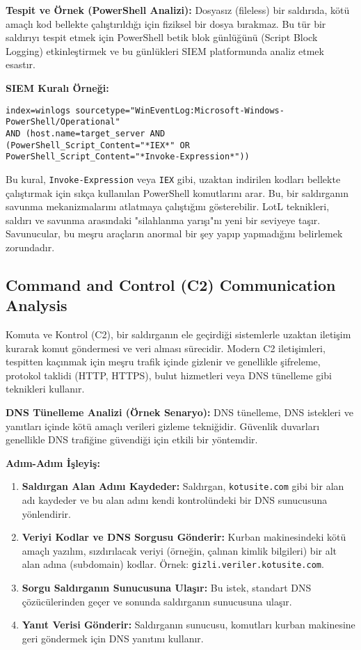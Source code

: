 \textbf{Tespit ve Örnek (PowerShell Analizi):}
Dosyasız (fileless) bir saldırıda, kötü amaçlı kod bellekte çalıştırıldığı için fiziksel bir dosya bırakmaz. Bu tür bir saldırıyı tespit etmek için PowerShell betik blok günlüğünü (Script Block Logging) etkinleştirmek ve bu günlükleri SIEM platformunda analiz etmek esastır.

\textbf{SIEM Kuralı Örneği:}
\begin{verbatim}
index=winlogs sourcetype="WinEventLog:Microsoft-Windows-PowerShell/Operational" 
AND (host.name=target_server AND 
(PowerShell_Script_Content="*IEX*" OR PowerShell_Script_Content="*Invoke-Expression*"))
\end{verbatim}

Bu kural, \texttt{Invoke-Expression} veya \texttt{IEX} gibi, uzaktan indirilen kodları bellekte çalıştırmak için sıkça kullanılan PowerShell komutlarını arar. Bu, bir saldırganın savunma mekanizmalarını atlatmaya çalıştığını gösterebilir. LotL teknikleri, saldırı ve savunma arasındaki "silahlanma yarışı"nı yeni bir seviyeye taşır. Savunucular, bu meşru araçların anormal bir şey yapıp yapmadığını belirlemek zorundadır.

\subsection{Command and Control (C2) Communication Analysis}

Komuta ve Kontrol (C2), bir saldırganın ele geçirdiği sistemlerle uzaktan iletişim kurarak komut göndermesi ve veri alması sürecidir. Modern C2 iletişimleri, tespitten kaçınmak için meşru trafik içinde gizlenir ve genellikle şifreleme, protokol taklidi (HTTP, HTTPS), bulut hizmetleri veya DNS tünelleme gibi teknikleri kullanır.

\textbf{DNS Tünelleme Analizi (Örnek Senaryo):}
DNS tünelleme, DNS istekleri ve yanıtları içinde kötü amaçlı verileri gizleme tekniğidir. Güvenlik duvarları genellikle DNS trafiğine güvendiği için etkili bir yöntemdir.

\textbf{Adım-Adım İşleyiş:}
\begin{enumerate}
    \item \textbf{Saldırgan Alan Adını Kaydeder:} Saldırgan, \texttt{kotusite.com} gibi bir alan adı kaydeder ve bu alan adını kendi kontrolündeki bir DNS sunucusuna yönlendirir.
    \item \textbf{Veriyi Kodlar ve DNS Sorgusu Gönderir:} Kurban makinesindeki kötü amaçlı yazılım, sızdırılacak veriyi (örneğin, çalınan kimlik bilgileri) bir alt alan adına (subdomain) kodlar. Örnek: \texttt{gizli.veriler.kotusite.com}.
    \item \textbf{Sorgu Saldırganın Sunucusuna Ulaşır:} Bu istek, standart DNS çözücülerinden geçer ve sonunda saldırganın sunucusuna ulaşır.
    \item \textbf{Yanıt Verisi Gönderir:} Saldırganın sunucusu, komutları kurban makinesine geri göndermek için DNS yanıtını kullanır.
\end{enumerate}

